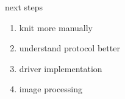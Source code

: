 \documentclass{beamer}
\begin{document}

\begin{frame}{next steps}
    \begin{enumerate}
        \item knit more manually
        \item understand protocol better
        \item driver implementation
        \item image processing
    \end{enumerate}
\end{frame}
\end{document}
